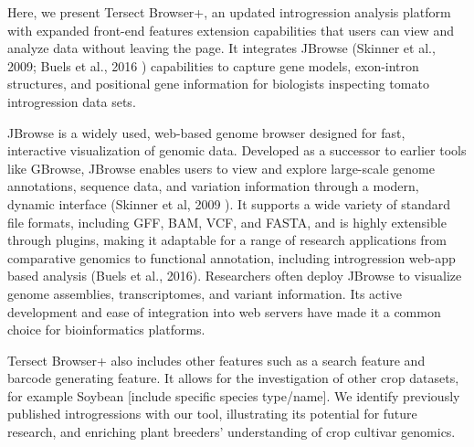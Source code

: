 \documentclass[unnumsec,webpdf,contemporary,large]{oup-authoring-template}%
\theoremstyle{thmstyleone}%
\theoremstyle{thmstyletwo}%
\theoremstyle{thmstylethree}%
\begin{document}
Here, we present Tersect Browser+, an updated introgression analysis platform with expanded front-end features extension capabilities that users can view and analyze data without leaving the page.  It integrates JBrowse (Skinner et al., 2009\cite{skinner_jbrowse_2009}; Buels et al., 2016 \cite{buels_jbrowse_2016}) capabilities to capture gene models, exon-intron structures, and positional gene information for biologists inspecting tomato introgression data sets. 

JBrowse is a widely used, web-based genome browser designed for fast, interactive visualization of genomic data. Developed as a successor to earlier tools like GBrowse, JBrowse enables users to view and explore large-scale genome annotations, sequence data, and variation information through a modern, dynamic interface (Skinner et al, 2009 \cite{skinner_jbrowse_2009}). It supports a wide variety of standard file formats, including GFF, BAM, VCF, and FASTA, and is highly extensible through plugins, making it adaptable for a range of research applications from comparative genomics to functional annotation, including introgression web-app based analysis (Buels et al., 2016\cite{buels_jbrowse_2016}). Researchers often deploy JBrowse to visualize genome assemblies, transcriptomes, and variant information. Its active development and ease of integration into web servers have made it a common choice for bioinformatics platforms. 

Tersect Browser+ also includes other features such as a search feature and barcode generating feature. It allows for the investigation of other crop datasets, for example Soybean [include specific species type/name]. We identify previously published introgressions with our tool, illustrating its potential for future research, and enriching plant breeders' understanding of crop cultivar genomics.
\end{document}
